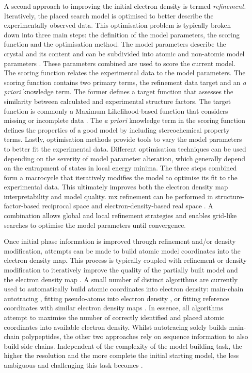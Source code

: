A second approach to improving the initial electron density is termed \textit{refinement}. Iteratively, the placed search model is optimised to better describe the experimentally observed data. This optimisation problem is typically broken down into three main steps: the definition of the model parameters, the scoring function and the optimisation method. The model parameters describe the crystal and its content and can be subdivided into atomic and non-atomic model parameters \cite{Afonine2012-bg}. These parameters combined are used to score the current model. The scoring function relates the experimental data to the model parameters. The scoring function contains two primary terms, the refinement data target and an \textit{a priori} knowledge term. The former defines a target function that assesses the similarity between calculated and experimental structure factors. The target function is commonly a Maximum Likelihood-based function that considers missing or incomplete data \cite{Murshudov2011-ww,Afonine2012-bg}. The \textit{a priori} knowledge term in the scoring function defines the properties of a good model by including stereochemical property terms. Lastly, optimisation methods provide tools to vary the model parameters to better fit the experimental data. Different optimisation techniques can be used depending on the severity of model parameter alteration, which generally depend on the entrapment of states in local energy minima. The three steps combined form a macrocycle that iteratively modifies the model to optimise its fit to the experimental data. This ultimately improves both the electron density map interpretability and model quality. \gls{mx} refinement can be performed in structure-factor-based reciprocal space and electron-density-based real space \cite{Afonine2012-bg}. A combination allows global and local refinement strategies and enables grid-like searches to optimise the model parameters until convergence.

Once initial phase information is improved through refinement and/or density modification, attempts can be made to build atomic model coordinates into the electron density map. This process is typically coupled with refinement or density modification to iteratively improve the quality of the partially built model and the electron density map \cite{Rupp2010-nc}. A small number of distinct algorithms are currently used to automatically build atomic coordinates into electron density: main-chain autotracing \cite{Sheldrick2010-cx}, fitting pseudo-atoms into electron density \cite{Lamzin2001-cn}, or fitting reference coordinates with similar electron density maps \cite{Terwilliger2004-ig,Cowtan2006-xv}. In essence, all algorithms attempt to maximise the number of correctly identified and placed atomic coordinates into available electron density. Whilst autotracing solely builds main-chain polypeptides, the other two approaches rely on sequence information to also build side-chains. Independent of the complexity of the model building task, the higher the resolution and the more complete the initial starting model, the less ambiguous and challenging this task becomes \cite{Rupp2010-nc}. 

